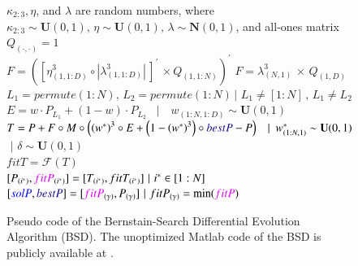 \documentclass[preprint,10pt,3p]{elsarticle}
\begin{document}
\begin{figure} [!htbp]
\begin{algorithm}[H]
{{}
$\kappa _{2:3}, \eta$, and $\lambda$ are random numbers, where  $\kappa _{2:3} \sim \textbf{U}(0,1),\, \eta \sim \textbf{U}(0,1),\, \lambda \sim \textbf{N}(0,1)$, and all-ones matrix $Q_{(\cdot,\cdot)}=1 $\\
{$ F = \left( {\left[ {\eta _{(1,1:D)}^3 \circ \left| \lambda _{(1,1:D)}^3 \right|\,} \right]^{'}\,\times {Q_{(1,1:N)}}} \right)^{'}$}
{$ F = \lambda _{\left( {N,1} \right)}^3\, \times \,{Q_{(1,D)}}$}
$ {L_{1}}=permute(1:N) ,\,  {L_{2}}=permute(1:N)\,|\,\,  L_{1} \neq [1:N] \, , \, L_{1} \neq L_{2} $\\
$ E = w \cdot {P_{ {L_{1}}}} + (1 - w) \cdot {P_{{{L_2}}}}\,\,\,\,\,|\,\,\,\,\,\,{w_{(1:N,1:D)}}\sim \textbf{U}(0,1)$\\
$ T = P + F \circ M \circ \left( {{{\left( {{w^*}} \right)}^3} \circ E + \left( {1 - {{\left( {{w^*}} \right)}^3}} \right) \circ  {\textcolor{ultramarine}{bestP}} - P} \right)\,\,\,\,\,|\,\,\,w_{(1:N,1)}^*\sim \textbf{U}(0,1)$\\
 $\,\,|\,\, \delta \sim \textbf{U}(0,1)$ \\
$fitT = \mathcal{F}(T)$\\
 {$ [P_{(i^{*})}, \textcolor{psychedelicpurple}{fitP}_{(i^{*})}] = [T_{(i^{*})} , fitT_{(i^{*})}] \,\,|\,\,i^{*} \in [1:N]$}\\
$[{\textcolor{ao}{solP}},{\textcolor{ultramarine}{bestP}}]=[\textcolor{psychedelicpurple}{fitP}_{({\gamma})},P_{({\gamma})}]\,\,|\,\,fit{P_{({\gamma})}} = \min (\textcolor{psychedelicpurple}{fitP})$
}
\end{algorithm}
\caption{Pseudo code of the Bernstain-Search Differential Evolution Algorithm (\textcolor{bluebell}{BSD}). The unoptimized Matlab code of the \textcolor{bluebell}{BSD} is publicly available at \citep{28}.}
\label{fig:1}
\end{figure}
\end{document}
